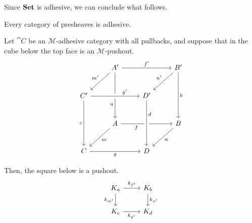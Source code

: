 Since $\mathbf{Set}$ is adhesive, we can conclude what follows.

\begin{cor}\label{cor:presh_adhesive}
    Every category of presheaves is adhesive.
\end{cor}

\color{blue}


\begin{lemma}\label{lemma:pushouts_kernel_pairs}
	Let $\cat C$ be an  $\mathcal{M}$-adhesive category with all pullbacks, and suppose that in the cube below the top face is an $\mathcal{M}$-pushout.
	\[\begin{tikzcd}[row sep=25, column sep=25]
		& {A'} && {B'} \\
		{C'} && {D'} \\
		& A && B \\
		C && D
		\arrow["{f'}", from=1-2, to=1-4]
		\arrow["{m'}"', from=1-2, to=2-1]
		\arrow["a"'{pos=0.7}, from=1-2, to=3-2]
		\arrow["{n'}"', from=1-4, to=2-3]
		\arrow["b", from=1-4, to=3-4]
		\arrow["{g'}"{pos=0.7}, from=2-1, to=2-3, crossing over]
		\arrow["c"', from=2-1, to=4-1]
		\arrow["f"'{pos=0.3}, from=3-2, to=3-4]
		\arrow["d"{pos=0.3}, from=2-3, to=4-3, crossing over]
		\arrow["m", from=3-2, to=4-1]
		\arrow["n", from=3-4, to=4-3]
		\arrow["g"', from=4-1, to=4-3]
	\end{tikzcd}\]
	
	Then, the square below is a pushout.
	\[
	\begin{tikzcd}%
		{K_a} \ar[r, "{k_{f'}}"] \ar[d, "{k_{m'}}"'] & {K_b} \ar[d, "{k_{n'}}"] \\
		{K_c} \ar[r, "{k_{g'}}"'] & {K_d}
	\end{tikzcd}
	\]
\end{lemma}

